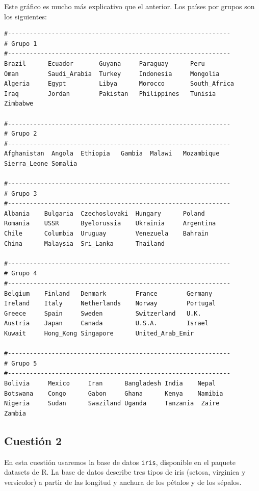 \documentclass[12pt,a4paper,twoside,openright,titlepage,final]{article}
\begin{document}
Este gráfico es mucho más explicativo que el anterior. Los países por grupos son los siguientes:

\begin{verbatim}
#-------------------------------------------------------------
# Grupo 1
#-------------------------------------------------------------
Brazil      Ecuador       Guyana     Paraguay      Peru         
Oman        Saudi_Arabia  Turkey     Indonesia     Mongolia     
Algeria     Egypt         Libya      Morocco       South_Africa 
Iraq        Jordan        Pakistan   Philippines   Tunisia    
Zimbabwe 

#-------------------------------------------------------------
# Grupo 2
#-------------------------------------------------------------
Afghanistan  Angola  Ethiopia   Gambia  Malawi   Mozambique 
Sierra_Leone Somalia 

#-------------------------------------------------------------
# Grupo 3
#-------------------------------------------------------------
Albania    Bulgaria  Czechoslovaki  Hungary      Poland       
Romania    USSR      Byelorussia    Ukrainia     Argentina         
Chile      Columbia  Uruguay        Venezuela    Bahrain         
China      Malaysia  Sri_Lanka      Thailand 

#-------------------------------------------------------------
# Grupo 4
#-------------------------------------------------------------
Belgium    Finland   Denmark        France        Germany           
Ireland    Italy     Netherlands    Norway        Portugal            
Greece     Spain     Sweden         Switzerland   U.K.          
Austria    Japan     Canada         U.S.A.        Israel           
Kuwait     Hong_Kong Singapore      United_Arab_Emir 

#-------------------------------------------------------------
# Grupo 5
#-------------------------------------------------------------
Bolivia     Mexico     Iran      Bangladesh India    Nepal   
Botswana    Congo      Gabon     Ghana      Kenya    Namibia    
Nigeria     Sudan      Swaziland Uganda     Tanzania  Zaire 
Zambia 
\end{verbatim}

\subsection{Cuestión 2}

En esta cuestión usaremos la base de datos \texttt{iris}, disponible en el paquete datasets de R. La base de datos describe tres tipos de iris (setosa, virginica y versicolor) a partir de las longitud y anchura de los pétalos y de los sépalos.\\
\end{document}

